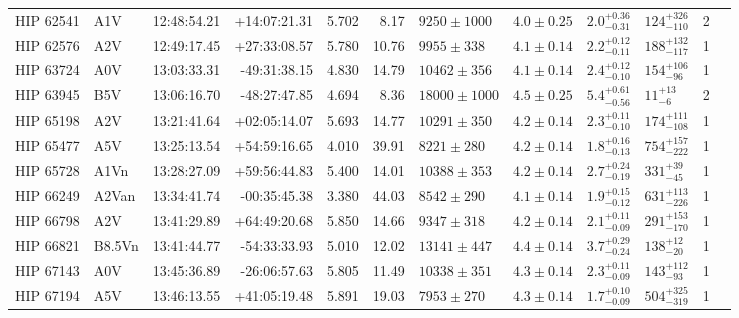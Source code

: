\begin{tiny}
\begin{longtable}{|l|lrrrrllllll|}
   HIP 62541 &      A1V &    12:48:54.21 &   +14:07:21.31 &   5.702 &      8.17 &   $9250 \pm 1000$ &  $4.0 \pm 0.25$ &  $2.0^{+0.36}_{-0.31}$ &   $124^{+326}_{-110}$ &       2 \\
   HIP 62576 &      A2V &    12:49:17.45 &   +27:33:08.57 &   5.780 &     10.76 &    $9955 \pm 338$ &  $4.1 \pm 0.14$ &  $2.2^{+0.12}_{-0.11}$ &   $188^{+132}_{-117}$ &       1 \\
   HIP 63724 &      A0V &    13:03:33.31 &   -49:31:38.15 &   4.830 &     14.79 &   $10462 \pm 356$ &  $4.1 \pm 0.14$ &  $2.4^{+0.12}_{-0.10}$ &    $154^{+106}_{-96}$ &       1 \\
   HIP 63945 &      B5V &    13:06:16.70 &   -48:27:47.85 &   4.694 &      8.36 &  $18000 \pm 1000$ &  $4.5 \pm 0.25$ &  $5.4^{+0.61}_{-0.56}$ &       $11^{+13}_{-6}$ &       2 \\
   HIP 65198 &      A2V &    13:21:41.64 &   +02:05:14.07 &   5.693 &     14.77 &   $10291 \pm 350$ &  $4.2 \pm 0.14$ &  $2.3^{+0.11}_{-0.10}$ &   $174^{+111}_{-108}$ &       1 \\
   HIP 65477 &      A5V &    13:25:13.54 &   +54:59:16.65 &   4.010 &     39.91 &    $8221 \pm 280$ &  $4.2 \pm 0.14$ &  $1.8^{+0.16}_{-0.13}$ &   $754^{+157}_{-222}$ &       1 \\
   HIP 65728 &     A1Vn &    13:28:27.09 &   +59:56:44.83 &   5.400 &     14.01 &   $10388 \pm 353$ &  $4.2 \pm 0.14$ &  $2.7^{+0.24}_{-0.19}$ &     $331^{+39}_{-45}$ &       1 \\
   HIP 66249 &    A2Van &    13:34:41.74 &   -00:35:45.38 &   3.380 &     44.03 &    $8542 \pm 290$ &  $4.1 \pm 0.14$ &  $1.9^{+0.15}_{-0.12}$ &   $631^{+113}_{-226}$ &       1 \\
   HIP 66798 &      A2V &    13:41:29.89 &   +64:49:20.68 &   5.850 &     14.66 &    $9347 \pm 318$ &  $4.2 \pm 0.14$ &  $2.1^{+0.11}_{-0.09}$ &   $291^{+153}_{-170}$ &       1 \\
   HIP 66821 &   B8.5Vn &    13:41:44.77 &   -54:33:33.93 &   5.010 &     12.02 &   $13141 \pm 447$ &  $4.4 \pm 0.14$ &  $3.7^{+0.29}_{-0.24}$ &     $138^{+12}_{-20}$ &       1 \\
   HIP 67143 &      A0V &    13:45:36.89 &   -26:06:57.63 &   5.805 &     11.49 &   $10338 \pm 351$ &  $4.3 \pm 0.14$ &  $2.3^{+0.11}_{-0.09}$ &    $143^{+112}_{-93}$ &       1 \\
   HIP 67194 &      A5V &    13:46:13.55 &   +41:05:19.48 &   5.891 &     19.03 &    $7953 \pm 270$ &  $4.3 \pm 0.14$ &  $1.7^{+0.10}_{-0.09}$ &   $504^{+325}_{-319}$ &       1 \\

\end{longtable}
\end{tiny}
